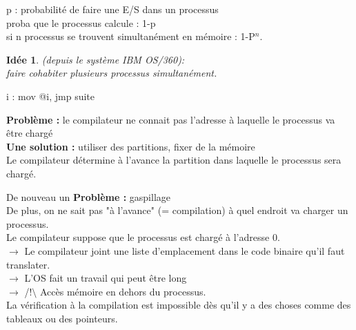 \documentclass[12pt,a4paper]{report}
\newtheorem*{id}{Idée}
\begin{document}
p : probabilité de faire une E/S dans un processus\\
proba que le processus calcule : 1-p\\
si n processus se trouvent simultanément en mémoire : 1-P$^n$.\\

\begin{id} (depuis le système IBM OS/360):\\
faire cohabiter plusieurs processus simultanément. 
\end{id}

\begin{center}
\end{center}
\begin{verbatimtab}
 i :
 mov @i, %
 jmp suite
\end{verbatimtab}

\textbf{Problème :} le compilateur ne connait pas l'adresse à laquelle le processus va être chargé\\

\textbf{Une solution :} utiliser des partitions, fixer de la mémoire\\
Le compilateur détermine à l'avance la partition dans laquelle le processus sera chargé.

De nouveau un
\textbf{Problème :} gaspillage\\
De plus, on ne sait pas "à l'avance" (= compilation) à quel endroit va charger un processus.\\

Le compilateur suppose que le processus est chargé à l'adresse 0.\\
$\rightarrow$ Le compilateur joint une liste d'emplacement dans le code binaire qu'il faut translater.\\
$\rightarrow$ L'OS fait un travail qui peut être long\\
$\rightarrow$ /!$\setminus$ Accès mémoire en dehors du processus.\\
La vérification à la compilation est impossible dès qu'il y a des choses comme des tableaux ou des pointeurs.\\
\end{document}
